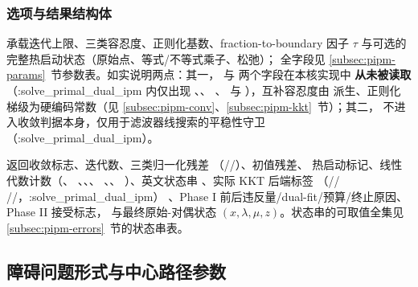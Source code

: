 \subsubsection*{选项与结果结构体}
 承载迭代上限、三类容忍度、正则化基数、fraction-to-boundary
因子 $\tau$ 与可选的完整热启动状态（原始点、等式/不等式乘子、松弛）；
全字段见 \ref{subsec:pipm-params}~节参数表。如实说明两点：其一，
 与  两个字段在本核实现中
\textbf{从未被读取}（:solve\_primal\_dual\_ipm 内仅出现 、、
、 与 ），互补容忍度由
 派生、正则化梯级为硬编码常数（见
\ref{subsec:pipm-conv}、\ref{subsec:pipm-kkt}~节）；其二，
不进入收敛判据本身，仅用于滤波器线搜索的平稳性守卫（:solve\_primal\_dual\_ipm）。

 返回收敛标志、迭代数、三类归一化残差
（//）、初值残差、
热启动标记、线性代数计数（、
、、、
、、
）、英文状态串 、实际 KKT 后端标签
（//
//，:solve\_primal\_dual\_ipm）
、Phase I 前后违反量/dual-fit/预算/终止原因、Phase II 接受标志，
与最终原始-对偶状态 $(x,\lambda,\mu,z)$。状态串的可取值全集见
\ref{subsec:pipm-errors}~节的状态串表。

\subsection{障碍问题形式与中心路径参数}\label{subsec:pipm-barrier}

